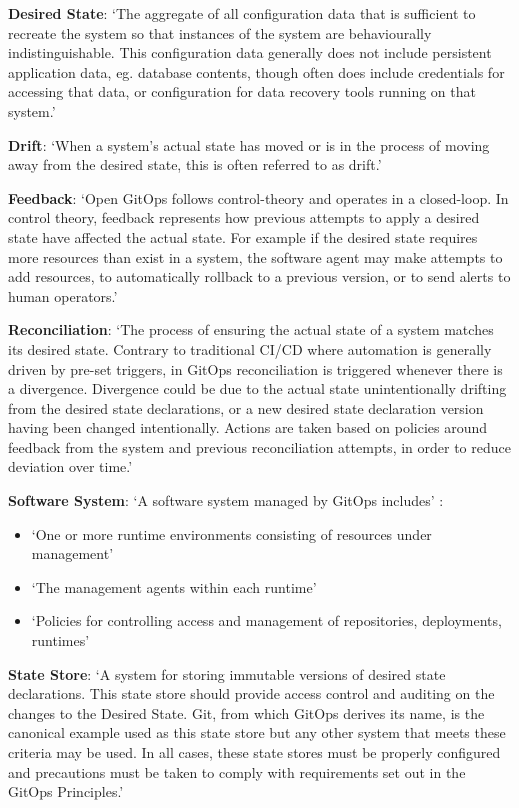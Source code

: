 \textbf{Desired State}:
\enquote*{The aggregate of all configuration data that is sufficient to recreate the system so that instances of the system are behaviourally indistinguishable. This configuration data generally does not include persistent application data, eg. database contents, though often does include credentials for accessing that data, or configuration for data recovery tools running on that system.}
\autocite{gitopsGlossary}

\textbf{Drift}:
\enquote*{When a system's actual state has moved or is in the process of moving away from the desired state, this is often referred to as drift.}
\autocite{gitopsGlossary}

\textbf{Feedback}:
\enquote*{Open GitOps follows control-theory and operates in a closed-loop. In control theory, feedback represents how previous attempts to apply a desired state have affected the actual state. For example if the desired state requires more resources than exist in a system, the software agent may make attempts to add resources, to automatically rollback to a previous version, or to send alerts to human operators.}
\autocite{gitopsGlossary}

\textbf{Reconciliation}:
\enquote*{The process of ensuring the actual state of a system matches its desired state. Contrary to traditional CI/CD where automation is generally driven by pre-set triggers, in GitOps reconciliation is triggered whenever there is a divergence. Divergence could be due to the actual state unintentionally drifting from the desired state declarations, or a new desired state declaration version having been changed intentionally. Actions are taken based on policies around feedback from the system and previous reconciliation attempts, in order to reduce deviation over time.}
\autocite{gitopsGlossary}

\textbf{Software System}:
\enquote*{A software system managed by GitOps includes} \autocite{gitopsGlossary}:
\begin{itemize}
	\item \enquote*{One or more runtime environments consisting of resources under management}
	\item \enquote*{The management agents within each runtime}
	\item \enquote*{Policies for controlling access and management of repositories, deployments, runtimes}
	\autocite{gitopsGlossary}
\end{itemize}

\textbf{State Store}:
\enquote*{A system for storing immutable versions of desired state declarations. This state store should provide access control and auditing on the changes to the Desired State. Git, from which GitOps derives its name, is the canonical example used as this state store but any other system that meets these criteria may be used. In all cases, these state stores must be properly configured and precautions must be taken to comply with requirements set out in the GitOps Principles.}
\autocite{gitopsGlossary}







